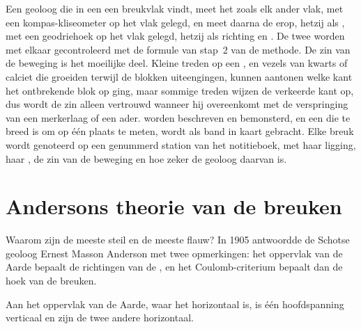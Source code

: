 \begin{inthefield}
Een geoloog die in een  een breukvlak vindt, meet het zoals elk ander vlak, met een kompas-kliseometer op het vlak gelegd, en meet daarna de  erop, hetzij als , met een geodriehoek op het vlak gelegd, hetzij als richting en . De twee worden met elkaar gecontroleerd met de formule van stap~2 van de methode. De zin van de beweging is het moeilijke deel. Kleine treden op een , en vezels van kwarts of calciet die groeiden terwijl de blokken uiteengingen, kunnen aantonen welke kant het ontbrekende blok op ging, maar sommige treden wijzen de verkeerde kant op, dus wordt de zin alleen vertrouwd wanneer hij overeenkomt met de verspringing van een merkerlaag of een ader.  worden beschreven en bemonsterd, en een  die te breed is om op één plaats te meten, wordt als band in kaart gebracht. Elke breuk wordt genoteerd op een genummerd station van het notitieboek, met haar ligging, haar , de zin van de beweging en hoe zeker de geoloog daarvan is.
\end{inthefield}

\section{Andersons theorie van de breuken}\label{sec:b1:faults-folds-fabrics:anderson}

Waarom zijn de meeste  steil en de meeste  flauw? In 1905 antwoordde de Schotse geoloog Ernest Masson Anderson met twee opmerkingen: het oppervlak van de Aarde bepaalt de richtingen van de , en het Coulomb-criterium bepaalt dan de hoek van de breuken.

\begin{proposition}\label{prop:b1:faults-folds-fabrics:free-surface}
Aan het oppervlak van de Aarde, waar het horizontaal is, is één hoofdspanning verticaal en zijn de twee andere horizontaal.
\end{proposition}

